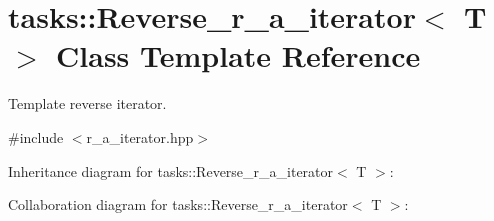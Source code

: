 \hypertarget{classtasks_1_1Reverse__r__a__iterator}{}\section{tasks\+:\+:Reverse\+\_\+r\+\_\+a\+\_\+iterator$<$ T $>$ Class Template Reference}
\label{classtasks_1_1Reverse__r__a__iterator}


Template reverse iterator.  




{\ttfamily \#include $<$r\+\_\+a\+\_\+iterator.\+hpp$>$}



Inheritance diagram for tasks\+:\+:Reverse\+\_\+r\+\_\+a\+\_\+iterator$<$ T $>$\+:


Collaboration diagram for tasks\+:\+:Reverse\+\_\+r\+\_\+a\+\_\+iterator$<$ T $>$\+:
